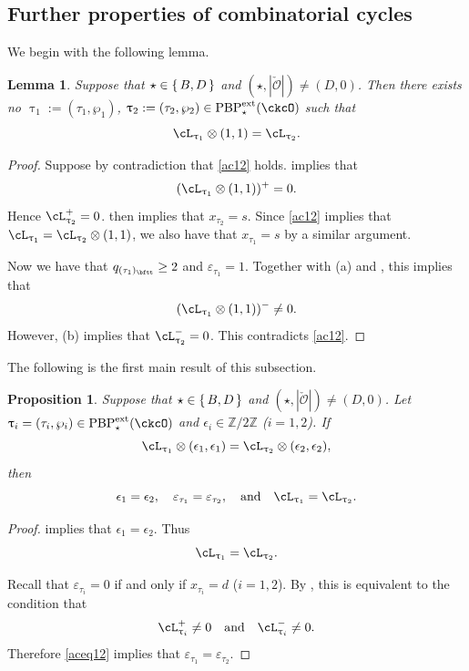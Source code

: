 \documentclass[11pt,a4paper]{amsart}
\def\abs#1{\left|{#1}\right|}
\newcommand{\CO}{{\mathcal {O}}}
\newcommand{\Z}{\mathbb{Z}}
\newcommand{\be}{\begin {equation}}
\newcommand{\ee}{\end {equation}}
\numberwithin{equation}{section}
\newtheorem{lem}[thm]{Lemma}
\newtheorem{prop}[thm]{Proposition}
\theoremstyle{remark}
\def\PBPe{\mathrm{PBP}^{\mathrm{ext}}}
\def\AND{\quad\text{and}\quad}
\def\ac{\cL}
\def\lotimes{\otimes}
\begin{document}
 \subsection{Further properties of combinatorial  cycles}\label{secfurth}
 
 We begin with the following lemma.
 \begin{lem}\label{lem:BD000}
Suppose that $\star \in \set{B,D}$ and $(\star, \abs{\check \CO})\neq (D, 0)$. Then there exists no  $\uptau_1:=(\tau_1,\wp_1)$, $\uptau_2:=(\tau_2,\wp_2)\in \PBPe_\star(\ckcO)$ such that
  \be\label{ac12}
    \ac_{\uptau_1}\lotimes (1,1)= \ac_{\uptau_2}.
  \ee
\end{lem}
\begin{proof}
Suppose by contradiction that \eqref{ac12} holds.  implies that
\[
(\ac_{\uptau_1}\lotimes (1,1))^+=0.
\]
Hence $\ac_{\uptau_2}^+=0$.  then implies that $x_{\tau_2}=s$. Since \eqref{ac12} implies that $\ac_{\uptau_1}= \ac_{\uptau_2}\lotimes (1,1)$, we also have that $x_{\tau_1}=s$ by a similar argument.  

Now we have that $q_{(\tau_1)_\bftt}\geq 2$ and $\varepsilon_{\tau_1}=1$.  Together with   (a) and , this implies that 
\[
(\ac_{\uptau_1}\lotimes (1,1))^- \neq 0.
\]
However,  (b) implies that $\ac_{\uptau_2}^-=0$. This contradicts \eqref{ac12}. 
\end{proof}
 The following is the first main result of this subsection. 
 
\begin{prop}\label{lem:BD1111}
Suppose that $\star \in \set{B,D}$ and $(\star, \abs{\check \CO})\neq (D, 0)$. Let $\uptau_i=(\tau_i, \wp_i)\in \PBPe_\star(\ckcO)$ and
  $\epsilon_i\in \Z/2\Z$ ($i=1,2$). If
  \[
    \ac_{\uptau_1}\lotimes (\epsilon_{1},\epsilon_{1})= \ac_{\uptau_2}\lotimes( \epsilon_{2},\epsilon_{2} ),
  \]
  then
  \[
    \epsilon_1=\epsilon_2,\quad \varepsilon_{\tau_1}=\varepsilon_{\tau_2}, \AND \ac_{\uptau_{1}}=\ac_{\uptau_{2}}.
  \]
\end{prop}

\begin{proof}
 implies that $\epsilon_{1}=\epsilon_{2}$. Thus 
\be\label{aceq12}
  \ac_{\uptau_{1}}=\ac_{\uptau_{2}}. 
\ee

Recall that $\varepsilon_{\tau_i}=0$ if and only if $x_{\tau_i}=d$ ($i=1,2$). By , this is equivalent to the condition that   
\[
  \ac_{\uptau_{i}}^+\neq 0\quad \textrm{and}\quad \ac_{\uptau_{i}}^-\neq 0.
\]
Therefore \eqref{aceq12} implies that  $\varepsilon_{\tau_1}=\varepsilon_{\tau_2}$. 
\end{proof}
\end{document}
